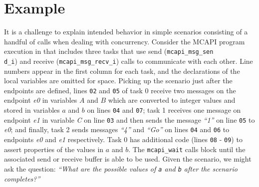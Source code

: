 \section{Example}

It is a challenge to explain intended behavior in simple scenarios
consisting of a handful of calls when dealing with concurrency. Consider
the MCAPI program execution in  that includes three
tasks that use send (\texttt{mcapi\_msg\_sen\\d\_i}) and receive
(\texttt{mcapi\_msg\_recv\_i}) calls to communicate with each other.
Line numbers appear in the first column for each task, and the
declarations of the local variables are omitted for space. Picking up
the scenario just after the endpoints are defined, lines \texttt{02}
and \texttt{05} of task 0 receive two messages on the endpoint
\textit{e0} in variables $A$ and $B$ which are
converted to integer values and stored in variables $a$ and
$b$ on lines \texttt{04} and \texttt{07}; task 1 receives one
message on endpoint \textit{e1} in variable \textit{C} on line
\texttt{03} and then sends the message \textit{``1''} on line \texttt{05} to
\textit{e0}; and finally, task 2 sends messages \textit{``4''} and \textit{``Go''} on
lines \texttt{04} and \texttt{06} to endpoints \textit{e0} and
\textit{e1} respectively. Task 0 has additional code (lines \texttt{08} -
\texttt{09}) to assert properties of the values in $a$ and
$b$. The \texttt{mcapi\_wait} calls block until the associated
send or receive buffer is able to be used. Given the scenario, we
might ask the question: \emph{``What are the possible values of
\texttt{a} and \texttt{b} after the scenario completes?''}


